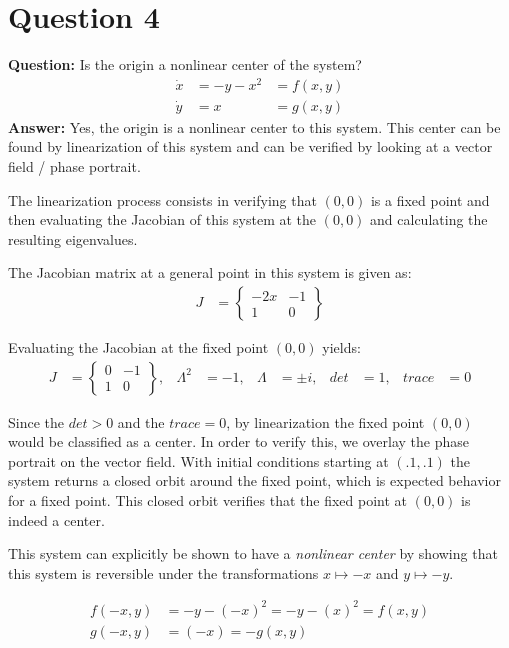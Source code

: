 \documentclass[12pt]{article}
\newenvironment{myenv}{\begin{adjustwidth}{1cm}{}}{\end{adjustwidth}}
\begin{document}
\section*{Question 4}
\begin{myenv}
\textbf{Question:} Is the origin a nonlinear center of the system?
\begin{alignat*}{3}
\dot{x} &= -y-x^2 &= f(x,y)\\
\dot{y} &= x &= g(x,y)
\end{alignat*}
\textbf{Answer:} Yes, the origin is a nonlinear center to this system. This center can be found by linearization of this system and can be verified by looking at a vector field / phase portrait.

The linearization process consists in verifying that $(0,0)$ is a fixed point and then evaluating the Jacobian of this system at the $(0,0)$ and calculating the resulting eigenvalues.

The Jacobian matrix at a general point in this system is given as:
\begin{align*}
	J &= 
	\begin{Bmatrix}
	-2x & -1 \\
	1 & 0
	\end{Bmatrix}
\end{align*}

Evaluating the Jacobian at the fixed point $(0,0)$ yields:
\begin{align*}
	J &= 
	\begin{Bmatrix}
	0 & -1 \\
	1 & 0
	\end{Bmatrix}, 	&\Lambda^2 &= -1,	&\Lambda &= \pm i, &det &= 1, &trace &= 0
\end{align*}

Since the $det>0$ and the $trace=0$, by linearization the fixed point $(0,0)$ would be classified as a center. In order to verify this, we overlay the phase portrait on the vector field. With initial conditions starting at $(.1,.1)$ the system returns a closed orbit around the fixed point, which is expected behavior for a fixed point. This closed orbit verifies that the fixed point at $(0,0)$ is indeed a center.

This system can explicitly be shown to have a \emph{nonlinear center} by showing that this system is reversible under the transformations $x \mapsto -x$ and $y \mapsto -y$.

\begin{alignat*}{3}
f(-x,y) &= -y-(-x)^2 = -y-(x)^2 = f(x,y) \\
g(-x,y) &= (-x) = -g(x,y)
\end{alignat*}


\end{myenv}
\end{document}
